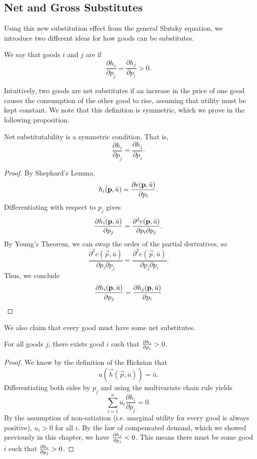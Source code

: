 \subsection*{Net and Gross Substitutes}
Using this new substitution effect from the general Slutsky equation, we introduce two different ideas for how goods can be substitutes.

\begin{definition*}
We say that goods $i$ and $j$ are  if 
$$
\frac{\partial h_{i}}{\partial p_{j}}=\frac{\partial h_{j}}{\partial p_{i}}>0.
$$
\end{definition*}
Intuitively, two goods are net substitutes if an increase in the price of one good causes the consumption of the other good to rise, assuming that utility must be kept constant. We note that this definition is symmetric, which we prove in the following proposition.

\begin{proposition*}
Net substitutability is a symmetric condition. That is, $$\frac{\partial h_{i}}{\partial p_{j}}=\frac{\partial h_{j}}{\partial p_{i}}.$$ 
\end{proposition*}

\begin{proof}
By Shephard's Lemma, 
$$h_i(\mathbf{p}, \bar{u}) = \pdv{e(\mathbf{p}, \bar{u})}{p_i}.$$
Differentiating with respect to $p_j$ gives
$$\pdv{h_i(\mathbf{p}, \bar{u})}{p_j} = \frac{\partial^2 e(\mathbf{p}, \bar{u})}{\partial p_i \partial p_j}.$$
By Young's Theorem, we can swap the order of the partial derivatives, so 
$$\frac{\partial^2 e(\vec{p}, \bar{u})}{\partial p_i \partial p_j} = \frac{\partial^2 e(\vec{p}, \bar{u})}{\partial p_j \partial p_i}.$$
Thus, we conclude 
$$\pdv{h_i(\mathbf{p}, \bar{u})}{p_j} = \pdv{h_j(\mathbf{p}, \bar{u})}{p_i}$$
\end{proof}
We also claim that every good must have some net substitutes.
\begin{proposition*}
For all goods $j$, there exists good $i$ such that $\pdv{h_i}{p_j} > 0$.
\end{proposition*}
\begin{proof}
We know by the definition of the Hicksian that
$$u(\vec{h}(\vec{p}, \bar{u})) = \bar{u}.$$
Differentiating both sides by $p_j$ and using the multivariate chain rule yields 
$$
\sum_{i=1}^{n} u_{i} \frac{\partial h_{i}}{\partial p_{j}}=0.
$$
By the assumption of non-satiation (i.e. marginal utility for every good is always positive), $u_i > 0$ for all $i$. By the law of compensated demand, which we showed previously in this chapter, we have $\pdv{h_j}{p_j} < 0$. This means there must be some good $i$ such that $\pdv{h_i}{p_j} > 0$.
\end{proof}


